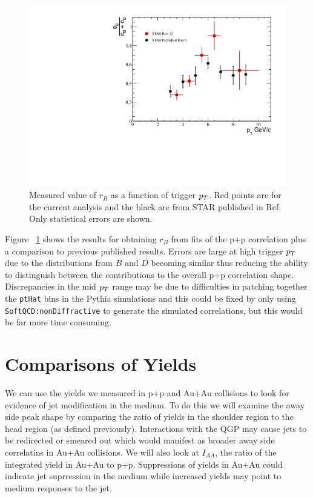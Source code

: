 \begin{figure}[htbp]
\begin{center}
\includegraphics[scale=.8]{Plots/Correlations/BD_ratio.pdf}
\end{center}
\caption[B/D Ratio]{Measured value of $r_B$ as a function of trigger $p_{T}$. Red points are for the current analysis and the black are from STAR published in Ref. Only statistical errors are shown.}
\label{fig:BDRatio}
\end{figure}

Figure ~\ref{fig:BDRatio} shows the results for obtaining $r_B$ from fits of the p+p correlation plus a comparison to previous published results. Errors are large at high trigger $p_{T}$ due to the distributions from $B$ and $D$ becoming similar thus reducing the ability to distinguish between the contributions to the overall p+p correlation shape. Discrepancies in the mid $p_{T}$ range may be due to difficulties in patching together the \texttt{ptHat} bins in the Pythia simulations and this could be fixed by only using \texttt{SoftQCD:nonDiffractive} to generate the simulated correlations, but this would be far more time consuming. 

\section{Comparisons of Yields}

We can use the yields we measured in p+p and Au+Au collisions to look for evidence of jet modification in the medium. To do this we will examine the away side peak shape by comparing the ratio of yields in the shoulder region to the head region (as defined previously). Interactions with the QGP may cause jets to be redirected or smeared out which would manifest as broader away side correlatins in Au+Au collisions. We will also look at $I_{AA}$, the ratio of the integrated yield in Au+Au to p+p. Suppressions of yields in Au+Au could indicate jet suprression in the medium while increased yields may point to medium responses to the jet.

